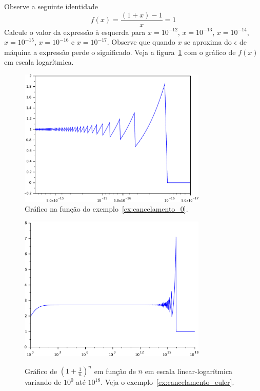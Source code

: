 \begin{ex}\label{ex:cancelamento_0}Observe a seguinte identidade
$$
f(x)=\frac{(1+x)-1}{x}=1
$$
Calcule o valor da expressão à esquerda para $x=10^{-12}$, $x=10^{-13}$, $x=10^{-14}$, $x=10^{-15}$, $x=10^{-16}$ e $x=10^{-17}$. Observe que quando $x$ se aproxima do $\epsilon$ de máquina a expressão perde o significado. Veja a figura~\ref{fig:cancelamento_0} com o gráfico de $f(x)$ em escala logarítmica.
\end{ex}

\begin{figure}
  \centering
  \includegraphics[width=0.8\textwidth]{./cap_aritmetica/pics/cancelamento_0}  
  \caption{Gráfico na função do exemplo~\ref{ex:cancelamento_0}.}
  \label{fig:cancelamento_0}
\end{figure}


\begin{figure}
  \includegraphics[width=0.8\textwidth]{./cap_aritmetica/pics/cancelamento_euler}
  \label{fig:cancelamento_euler}
  \caption{Gráfico de $\left(1+\frac{1}{n}\right)^n$ em função de $n$ em escala linear-logarítmica variando de $10^0$ até $10^{18}$. Veja o exemplo~\ref{ex:cancelamento_euler}.}
\end{figure}


